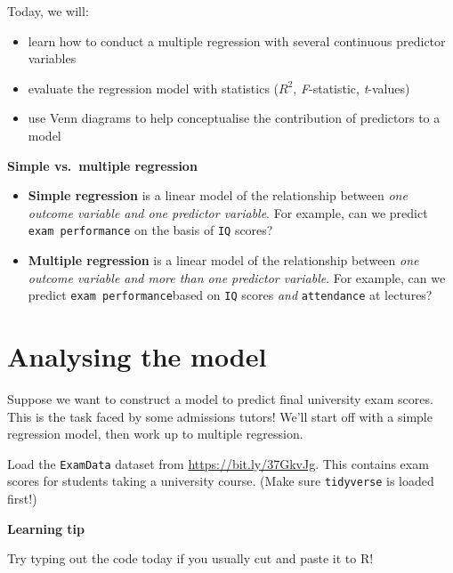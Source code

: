 \documentclass[
]{book}
\theoremstyle{definition}
\theoremstyle{definition}
\theoremstyle{definition}
\theoremstyle{definition}
\theoremstyle{remark}
\begin{document}
\hfill\break
Today, we will:

\begin{itemize}
\item
  learn how to conduct a multiple regression with several continuous predictor variables
\item
  evaluate the regression model with statistics (\(R^2\), \emph{F}-statistic, \emph{t}-values)
\item
  use Venn diagrams to help conceptualise the contribution of predictors to a model
\end{itemize}

\textbf{Simple vs.~multiple regression}

\begin{itemize}
\item
  \textbf{Simple regression} is a linear model of the relationship between \emph{one outcome variable and one predictor variable}. For example, can we predict \texttt{exam\ performance} on the basis of \texttt{IQ} scores?
\item
  \textbf{Multiple regression} is a linear model of the relationship between \emph{one outcome variable and more than one predictor variable}. For example, can we predict \texttt{exam\ performance}based on \texttt{IQ} scores \emph{and} \texttt{attendance} at lectures?
\end{itemize}

\hypertarget{analysing-the-model}{%
\section{Analysing the model}\label{analysing-the-model}}

Suppose we want to construct a model to predict final university exam scores. This is the task faced by some admissions tutors! We'll start off with a simple regression model, then work up to multiple regression.

Load the \texttt{ExamData} dataset from \url{https://bit.ly/37GkvJg}. This contains exam scores for students taking a university course. (Make sure \texttt{tidyverse} is loaded first!)

\textbf{Learning tip}

Try typing out the code today if you usually cut and paste it to R!
\end{document}
